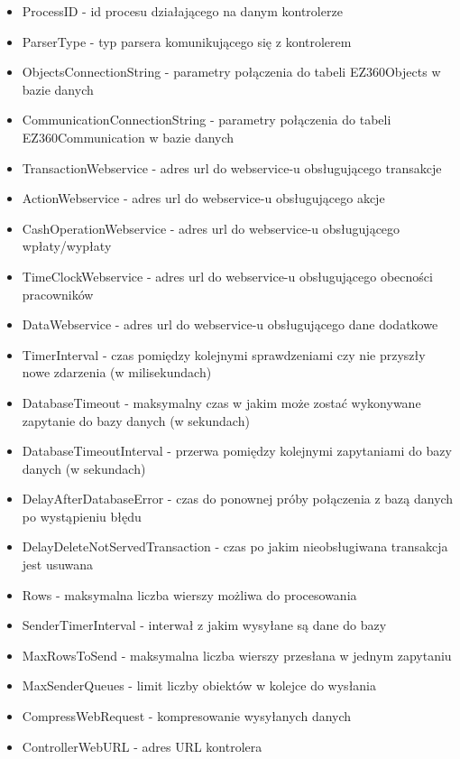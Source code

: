 \documentclass[a4paper]{book}
\begin{document}
\begin{itemize}
	\item ProcessID - id procesu działającego na danym kontrolerze
	\item ParserType - typ parsera komunikującego się z kontrolerem
	\item ObjectsConnectionString - parametry połączenia do tabeli EZ360Objects w bazie danych
	\item CommunicationConnectionString - parametry połączenia do tabeli EZ360Communication w bazie danych
	\item TransactionWebservice - adres url do webservice-u obsługującego transakcje
	\item ActionWebservice - adres url do webservice-u obsługującego akcje
	\item CashOperationWebservice - adres url do webservice-u obsługującego wpłaty/wypłaty
	\item TimeClockWebservice - adres url do webservice-u obsługującego obecności pracowników
	\item DataWebservice - adres url do webservice-u obsługującego dane dodatkowe
	\item TimerInterval - czas pomiędzy kolejnymi sprawdzeniami czy nie przyszły nowe zdarzenia (w milisekundach)
	\item DatabaseTimeout - maksymalny czas w jakim może zostać wykonywane zapytanie do bazy danych (w sekundach)
	\item DatabaseTimeoutInterval - przerwa pomiędzy kolejnymi zapytaniami do bazy danych (w sekundach)
	\item DelayAfterDatabaseError - czas do ponownej próby połączenia z bazą danych po wystąpieniu błędu
	\item DelayDeleteNotServedTransaction - czas po jakim nieobsługiwana transakcja jest usuwana
	\item Rows - maksymalna liczba wierszy możliwa do procesowania
	\item SenderTimerInterval - interwał z jakim wysyłane są dane do bazy
	\item MaxRowsToSend - maksymalna liczba wierszy przesłana w jednym zapytaniu
	\item MaxSenderQueues - limit liczby obiektów w kolejce do wysłania
	\item CompressWebRequest - kompresowanie wysyłanych danych
	\item ControllerWebURL - adres URL kontrolera
\end{itemize}
\end{document}
